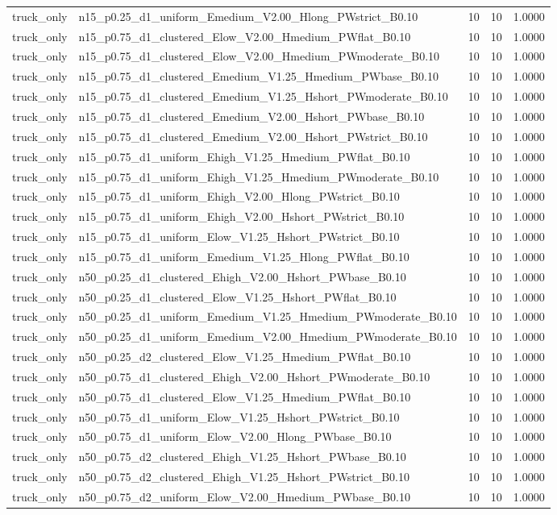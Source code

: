 \begin{tabular}{llrrr}
truck_only & n15_p0.25_d1_uniform_Emedium_V2.00_Hlong_PWstrict_B0.10 & 10 & 10 & 1.0000 \\
truck_only & n15_p0.75_d1_clustered_Elow_V2.00_Hmedium_PWflat_B0.10 & 10 & 10 & 1.0000 \\
truck_only & n15_p0.75_d1_clustered_Elow_V2.00_Hmedium_PWmoderate_B0.10 & 10 & 10 & 1.0000 \\
truck_only & n15_p0.75_d1_clustered_Emedium_V1.25_Hmedium_PWbase_B0.10 & 10 & 10 & 1.0000 \\
truck_only & n15_p0.75_d1_clustered_Emedium_V1.25_Hshort_PWmoderate_B0.10 & 10 & 10 & 1.0000 \\
truck_only & n15_p0.75_d1_clustered_Emedium_V2.00_Hshort_PWbase_B0.10 & 10 & 10 & 1.0000 \\
truck_only & n15_p0.75_d1_clustered_Emedium_V2.00_Hshort_PWstrict_B0.10 & 10 & 10 & 1.0000 \\
truck_only & n15_p0.75_d1_uniform_Ehigh_V1.25_Hmedium_PWflat_B0.10 & 10 & 10 & 1.0000 \\
truck_only & n15_p0.75_d1_uniform_Ehigh_V1.25_Hmedium_PWmoderate_B0.10 & 10 & 10 & 1.0000 \\
truck_only & n15_p0.75_d1_uniform_Ehigh_V2.00_Hlong_PWstrict_B0.10 & 10 & 10 & 1.0000 \\
truck_only & n15_p0.75_d1_uniform_Ehigh_V2.00_Hshort_PWstrict_B0.10 & 10 & 10 & 1.0000 \\
truck_only & n15_p0.75_d1_uniform_Elow_V1.25_Hshort_PWstrict_B0.10 & 10 & 10 & 1.0000 \\
truck_only & n15_p0.75_d1_uniform_Emedium_V1.25_Hlong_PWflat_B0.10 & 10 & 10 & 1.0000 \\
truck_only & n50_p0.25_d1_clustered_Ehigh_V2.00_Hshort_PWbase_B0.10 & 10 & 10 & 1.0000 \\
truck_only & n50_p0.25_d1_clustered_Elow_V1.25_Hshort_PWflat_B0.10 & 10 & 10 & 1.0000 \\
truck_only & n50_p0.25_d1_uniform_Emedium_V1.25_Hmedium_PWmoderate_B0.10 & 10 & 10 & 1.0000 \\
truck_only & n50_p0.25_d1_uniform_Emedium_V2.00_Hmedium_PWmoderate_B0.10 & 10 & 10 & 1.0000 \\
truck_only & n50_p0.25_d2_clustered_Elow_V1.25_Hmedium_PWflat_B0.10 & 10 & 10 & 1.0000 \\
truck_only & n50_p0.75_d1_clustered_Ehigh_V2.00_Hshort_PWmoderate_B0.10 & 10 & 10 & 1.0000 \\
truck_only & n50_p0.75_d1_clustered_Elow_V1.25_Hmedium_PWflat_B0.10 & 10 & 10 & 1.0000 \\
truck_only & n50_p0.75_d1_uniform_Elow_V1.25_Hshort_PWstrict_B0.10 & 10 & 10 & 1.0000 \\
truck_only & n50_p0.75_d1_uniform_Elow_V2.00_Hlong_PWbase_B0.10 & 10 & 10 & 1.0000 \\
truck_only & n50_p0.75_d2_clustered_Ehigh_V1.25_Hshort_PWbase_B0.10 & 10 & 10 & 1.0000 \\
truck_only & n50_p0.75_d2_clustered_Ehigh_V1.25_Hshort_PWstrict_B0.10 & 10 & 10 & 1.0000 \\
truck_only & n50_p0.75_d2_uniform_Elow_V2.00_Hmedium_PWbase_B0.10 & 10 & 10 & 1.0000 \\
\bottomrule
\end{tabular}

